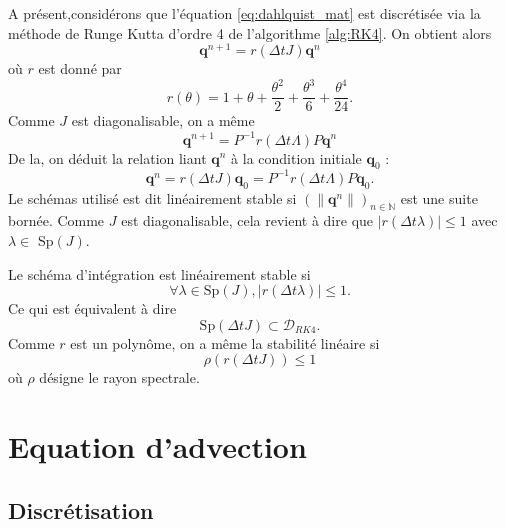 A présent,considérons que l'équation \eqref{eq:dahlquist_mat} est discrétisée via la méthode de Runge Kutta d'ordre 4 de l'algorithme \ref{alg:RK4}. On obtient alors 
\begin{equation}
\mathbf{q}^{n+1} = r(\Delta t J) \mathbf{q}^n
\end{equation}
où $r$ est donné par 
\begin{equation}
r(\theta) = 1 + \theta + \dfrac{\theta^2}{2} + \dfrac{\theta^3}{6} + \dfrac{\theta^4}{24}.
\end{equation}
Comme $J$ est diagonalisable, on a même
\begin{equation}
\mathbf{q}^{n+1} = P^{-1}r(\Delta t \Lambda)P \mathbf{q}^n
\end{equation}
De la, on déduit la relation liant $\mathbf{q}^n$ à la condition initiale $\mathbf{q}_0$ : 
\begin{equation}
\mathbf{q}^n = r(\Delta t J) \mathbf{q}_0 = P^{-1}r(\Delta t \Lambda)P \mathbf{q}_0.
\end{equation}
Le schémas utilisé est dit linéairement stable si $\left( \| \mathbf{q}^n \| \right)_{n \in \mathbb{N}}$ est une suite bornée. Comme $J$ est diagonalisable, cela revient à dire que $| r(\Delta t \lambda) | \leq 1$ avec $\lambda \in $ Sp$(J)$.

\begin{proposition}
Le schéma d'intégration est linéairement stable si
\begin{equation}
\forall \lambda \in \text{Sp}(J), |r(\Delta t \lambda)| \leq 1.
\end{equation}
Ce qui est équivalent à dire
\begin{equation}
\text{Sp}(\Delta t J) \subset \mathcal{D}_{RK4}.
\end{equation}
Comme $r$ est un polynôme, on a même la stabilité linéaire si
\begin{equation}
\rho(r(\Delta t J)) \leq 1
\end{equation}
où $\rho$ désigne le rayon spectrale.
\end{proposition}










\section{Equation d'advection}

\subsection{Discrétisation}

